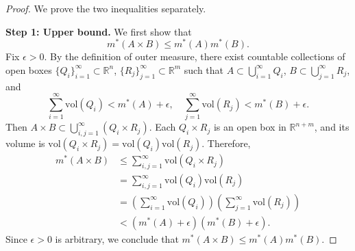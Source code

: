 \begin{proof}
We prove the two inequalities separately.

\textbf{Step 1: Upper bound.} We first show that
\[
    m^{*}(A\times B)\le m^{*}(A)m^{*}(B).
\]
Fix $\epsilon>0$. By the definition of outer measure, there exist countable collections of open boxes $\{Q_{i}\}_{i=1}^{\infty}\subset \mathbb{R}^{n}$, $\{R_{j}\}_{j=1}^{\infty}\subset \mathbb{R}^{m}$ such that $A\subset\bigcup_{i=1}^{\infty}Q_{i}$, $B\subset\bigcup_{j=1}^{\infty}R_{j}$, and
\[
    \sum_{i=1}^{\infty}\text{vol}(Q_{i})<m^{*}(A)+\epsilon, \quad \sum_{j=1}^{\infty}\text{vol}(R_{j})<m^{*}(B)+\epsilon.
\]
Then $A\times B\subset\bigcup_{i,j=1}^{\infty}(Q_{i}\times R_{j})$. Each $Q_{i}\times R_{j}$ is an open box in $\mathbb{R}^{n+m}$, and its volume is $\text{vol}(Q_{i}\times R_{j})=\text{vol}(Q_{i})\text{vol}(R_{j})$. Therefore,
\begin{align*}
m^{*}(A\times B) &\le \sum_{i,j=1}^{\infty}\text{vol}(Q_{i}\times R_{j}) \\
&= \sum_{i,j=1}^{\infty}\text{vol}(Q_{i})\text{vol}(R_{j}) \\
&= \left(\sum_{i=1}^{\infty}\text{vol}(Q_{i})\right)\left(\sum_{j=1}^{\infty}\text{vol}(R_{j})\right) \\
&< (m^{*}(A)+\epsilon)(m^{*}(B)+\epsilon).
\end{align*}
Since $\epsilon>0$ is arbitrary, we conclude that $m^{*}(A\times B)\le m^{*}(A)m^{*}(B)$.


\end{proof}
